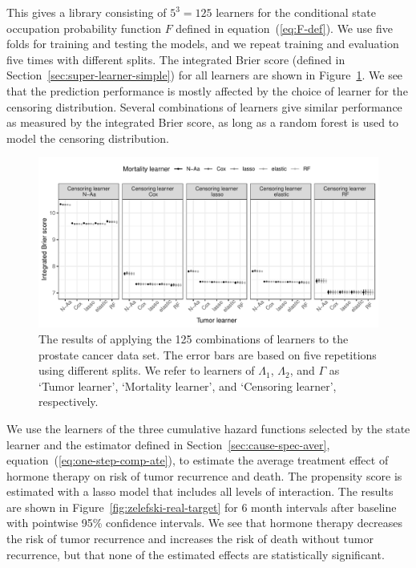 This gives a library consisting of \( 5^3 = 125 \) learners for the
conditional state occupation probability function \( F \) defined in
equation~(\ref{eq:F-def}). We use five folds for training and testing
the models, and we repeat training and evaluation five times with
different splits.  The integrated Brier score (defined in
Section~\ref{sec:super-learner-simple}) for all learners are shown in
Figure~\ref{fig:zelefski-real}. We see that the prediction
performance is mostly affected by the choice of learner for the
censoring distribution. Several combinations of learners give similar
performance as measured by the integrated Brier score, as long as a
random forest is used to model the censoring distribution.

\begin{figure}
  \centering %
  \includegraphics[width=1\linewidth]{real-data-state-learner.pdf}
  \caption[]{The results of applying the 125 combinations of learners to the
    prostate cancer data set. The error bars are based on five repetitions using
    different splits. We refer to learners of \( \Lambda_1 \), \( \Lambda_2 \),
    and $\Gamma$ as `Tumor learner', `Mortality learner', and `Censoring
    learner', respectively.}
  \label{fig:zelefski-real}
\end{figure}


We use the learners of the three cumulative hazard functions selected
by the state learner and the estimator defined in
Section~\ref{sec:cause-spec-aver},
equation~(\ref{eq:one-step-comp-ate}), to estimate the average
treatment effect of hormone therapy on risk of tumor recurrence and
death. The propensity score is estimated with a lasso model that
includes all levels of interaction.
The results are shown in Figure~\ref{fig:zelefski-real-target} for 6
month intervals after baseline with pointwise 95\% confidence
intervals. We see that hormone therapy decreases the risk of tumor
recurrence and increases the risk of death without tumor recurrence,
but that none of the estimated effects are statistically significant.


